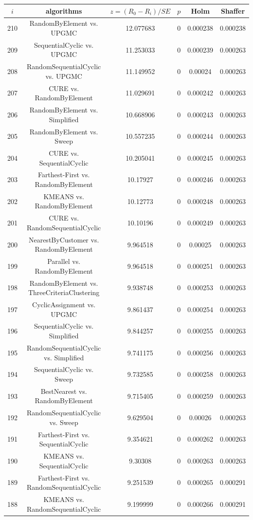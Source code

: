 \documentclass[a4paper,10pt]{article}
\begin{document}
\begin{landscape}
\begin{table}[!htp]
\centering\scriptsize
\begin{tabular}{cccccc}
$i$&algorithms&$z=(R_0 - R_i)/SE$&$p$&Holm&Shaffer\\
\hline210&RandomByElement vs. UPGMC&12.077683&0&0.000238&0.000238\\
209&SequentialCyclic vs. UPGMC&11.253033&0&0.000239&0.000263\\
208&RandomSequentialCyclic vs. UPGMC&11.149952&0&0.00024&0.000263\\
207&CURE vs. RandomByElement&11.029691&0&0.000242&0.000263\\
206&RandomByElement vs. Simplified&10.668906&0&0.000243&0.000263\\
205&RandomByElement vs. Sweep&10.557235&0&0.000244&0.000263\\
204&CURE vs. SequentialCyclic&10.205041&0&0.000245&0.000263\\
203&Farthest-First vs. RandomByElement&10.17927&0&0.000246&0.000263\\
202&KMEANS vs. RandomByElement&10.12773&0&0.000248&0.000263\\
201&CURE vs. RandomSequentialCyclic&10.10196&0&0.000249&0.000263\\
200&NearestByCustomer vs. RandomByElement&9.964518&0&0.00025&0.000263\\
199&Parallel vs. RandomByElement&9.964518&0&0.000251&0.000263\\
198&RandomByElement vs. ThreeCriteriaClustering&9.938748&0&0.000253&0.000263\\
197&CyclicAssignment vs. UPGMC&9.861437&0&0.000254&0.000263\\
196&SequentialCyclic vs. Simplified&9.844257&0&0.000255&0.000263\\
195&RandomSequentialCyclic vs. Simplified&9.741175&0&0.000256&0.000263\\
194&SequentialCyclic vs. Sweep&9.732585&0&0.000258&0.000263\\
193&BestNearest vs. RandomByElement&9.715405&0&0.000259&0.000263\\
192&RandomSequentialCyclic vs. Sweep&9.629504&0&0.00026&0.000263\\
191&Farthest-First vs. SequentialCyclic&9.354621&0&0.000262&0.000263\\
190&KMEANS vs. SequentialCyclic&9.30308&0&0.000263&0.000263\\
189&Farthest-First vs. RandomSequentialCyclic&9.251539&0&0.000265&0.000291\\
188&KMEANS vs. RandomSequentialCyclic&9.199999&0&0.000266&0.000291\\

\end{tabular}
\end{table}
\end{landscape}
\end{document}
